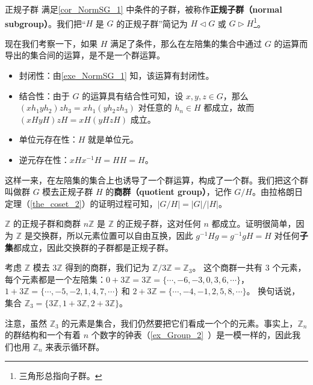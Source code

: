 \begin{definition}{正规子群}\label{def_NormSG_1}
满足\autoref{cor_NormSG_1} 中条件的子群，被称作\textbf{正规子群（normal subgroup）}。我们把“$H$ 是 $G$ 的正规子群”简记为 $H\vartriangleleft G$ 或 $G\vartriangleright H$\footnote{三角形总指向子群。}。
\end{definition}

现在我们考察一下，如果 $H$ 满足了条件，那么在左陪集的集合中通过 $G$ 的运算而导出的集合间的运算，是不是一个群运算。
\begin{itemize}
\item 封闭性：由\autoref{exe_NormSG_1} 知，该运算有封闭性。
\item 结合性：由于 $G$ 的运算具有结合性可知，设 $x, y, z\in G$，那么 $(xh_1yh_2)zh_3=xh_1(yh_2zh_3)$ 对任意的 $h_n\in H$ 都成立，故而 $(xHyH)zH=xH(yHzH)$ 成立。
\item 单位元存在性：$H$ 就是单位元。
\item 逆元存在性：$xHx^{-1}H=HH=H$。
\end{itemize}

这样一来，在左陪集的集合上也诱导了一个群运算，构成了一个群。我们把这个群叫做群 $G$ 模去正规子群 $H$ 的\textbf{商群（quotient group）}，记作 $G/H$。由拉格朗日定理（\autoref{the_coset_2}）的证明过程可知，$|G/H|={|G|}/{|H|}$。

\begin{example}{$\mathbb{Z}$ 的正规子群和商群}\label{ex_NormSG_4}
$n\mathbb{Z}$ 是 $\mathbb{Z}$ 的正规子群，这对任何 $n$ 都成立。证明很简单，因为 $\mathbb{Z}$ 是交换群，所以元素位置可以自由互换，因此 $g^{-1}Hg=g^{-1}gH=H$ 对任何\textbf{子集}都成立，因此交换群的子群都是正规子群。

考虑 $\mathbb{Z}$ 模去 $3\mathbb{Z}$ 得到的商群，我们记为 $\mathbb{Z}/3\mathbb{Z}=\mathbb{Z}_3$。 这个商群一共有 $3$ 个元素，每个元素都是一个左陪集：$0+3\mathbb{Z}=3\mathbb{Z}=\{\cdots, -6, -3, 0, 3, 6, \cdots\}$，$1+3\mathbb{Z}=\{\cdots, -5, -2, 1, 4, 7, \cdots\}$ 和 $2+3\mathbb{Z}=\{\cdots, -4, -1, 2, 5, 8, \cdots\}$。 换句话说，集合 $\mathbb{Z}_3=\{3\mathbb{Z}, 1+3\mathbb{Z}, 2+3\mathbb{Z}\}$。

注意，虽然 $\mathbb{Z}_3$ 的元素是集合，我们仍然要把它们看成一个个的元素。事实上，$\mathbb{Z}_n$ 的群结构和一个有着 $n$ 个数字的钟表（\autoref{ex_Group_2}~）是一模一样的，因此我们也用 $\mathbb{Z}_n$ 来表示循环群。 
\end{example}

